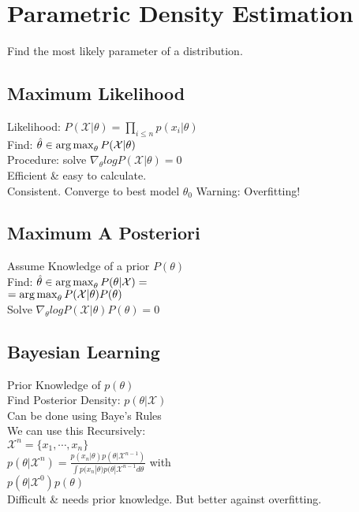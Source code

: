 \section*{Parametric Density Estimation}
Find the most likely parameter of a distribution.

\subsection*{Maximum Likelihood}
Likelihood: $P(\mathcal{X}|\theta)=\prod_{i\leq n}p(x_i|\theta)$\\
Find: $\hat{\theta}\in \operatorname*{arg\,max}_\theta P(\mathcal{X}|\theta)$\\
Procedure: solve $\nabla_\theta log P(\mathcal{X}|\theta)=0$\\
Efficient \& easy to calculate.\\
Consistent. Converge to best model $\theta_0$
Warning: Overfitting!

\subsection*{Maximum A Posteriori}
Assume Knowledge of a prior $P(\theta)$\\
Find: $\hat{\theta}\in \operatorname*{arg\,max}_\theta P(\theta|\mathcal{X}) =$\\
$=\operatorname*{arg\,max}_\theta P(\mathcal{X}|\theta)P(\theta)$\\
Solve $\nabla_\theta log P(\mathcal{X}|\theta)P(\theta)=0$

\subsection*{Bayesian Learning}
Prior Knowledge of $p(\theta)$\\
Find Posterior Density: $p(\theta|\mathcal{X})$\\
Can be done using Baye's Rules\\
We can use this Recursively:\\
$\mathcal{X}^n=\{x_1, \cdots, x_n\}$\\
$p(\theta|\mathcal{X}^n)=\frac{p(x_n|\theta)p(\theta|\mathcal{X}^{n-1})}{\int p(x_n|\theta)p(\theta|\mathcal{X}^{n-1} d\theta}$ with\\
$p(\theta|\mathcal{X}^0)p(\theta)$\\
Difficult \& needs prior knowledge. But better against overfitting.